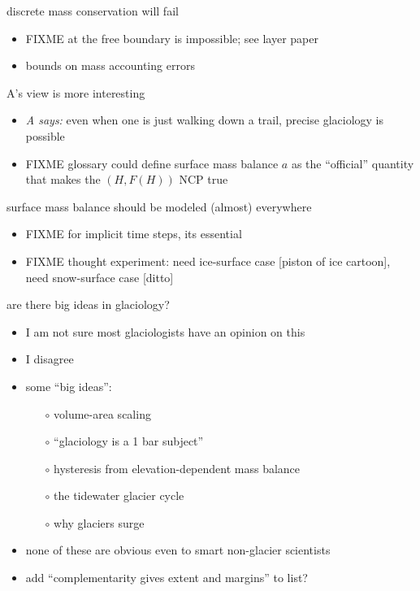 \documentclass[10pt,hyperref,dvipsnames]{beamer}
\begin{document}
\begin{frame}{discrete mass conservation will fail}
\begin{itemize}
\item FIXME at the free boundary is impossible; see layer paper
\item bounds on mass accounting errors
\end{itemize}
\end{frame}

\begin{frame}{A's view is more interesting}
\begin{itemize}
\item \emph{A says:} even when one is just walking down a trail, precise glaciology is possible
\item FIXME glossary could define surface mass balance $a$ as the ``official'' quantity that makes the $(H,F(H))$ NCP true
\end{itemize}
\end{frame}

\begin{frame}{surface mass balance should be modeled (almost) everywhere}
\begin{itemize}
\item FIXME for implicit time steps, its essential
\item FIXME thought experiment: need ice-surface case [piston of ice cartoon], need snow-surface case [ditto]
\end{itemize}
\end{frame}


\begin{frame}{are there big ideas in glaciology?}
\begin{itemize}
\item I am not sure most glaciologists have an opinion on this
\item<2-4> I disagree

\bigskip
\item<3-4> some ``big ideas'':
    \begin{itemize}
    \item[$\circ$] volume-area scaling
    \item[$\circ$] ``glaciology is a 1 bar subject''
    \item[$\circ$] hysteresis from elevation-dependent mass balance
    \item[$\circ$] the tidewater glacier cycle
    \item[$\circ$] why glaciers surge
    \end{itemize}
\item<3-4> none of these are obvious even to smart non-glacier scientists

\bigskip
\item<4> add ``complementarity gives extent and margins'' to list?
\end{itemize}
\end{frame}
\end{document}
